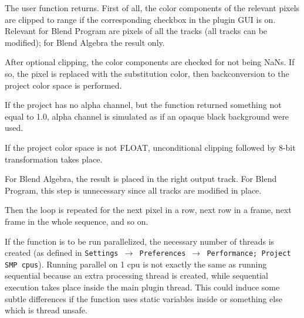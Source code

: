 The user function returns. First of all, the color components of the relevant pixels are clipped to range if the corresponding checkbox in the plugin GUI is on. Relevant for Blend Program are pixels of all the tracks (all tracks can be modified); for Blend Algebra the result only.

After optional clipping, the color components are checked for not being NaNs.
If so, the pixel is replaced with the substitution color, then backconversion to the project color space is performed.

If the project has no alpha channel, but the function returned something not equal to 1.0, alpha channel is simulated as if an opaque black background were used.

If the project color space is not FLOAT, unconditional clipping followed by 8-bit transformation takes place.

For Blend Algebra, the result is placed in the right output track. For Blend Program, this step is unnecessary since all tracks are modified in place.

Then the loop is repeated for the next pixel in a row, next row in a frame, next frame in the whole sequence, and so on.

If the function is to be run parallelized, the necessary number of threads is created (as defined in \texttt{Settings $\rightarrow$ Preferences $\rightarrow$ Performance; Project SMP cpus}). Running parallel on 1 cpu is not exactly the same as running sequential because an extra processing thread is created, while sequential execution takes place inside the main plugin thread. This could induce some subtle differences if the function uses static variables inside or something else which is thread unsafe.

